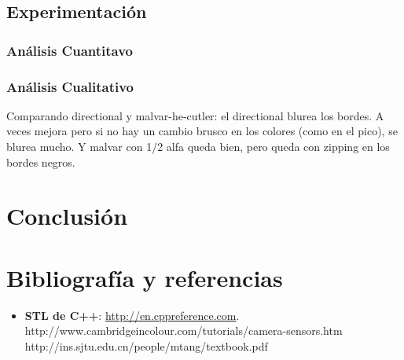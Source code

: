 	
\subsection{Experimentación}


\subsubsection{Análisis Cuantitavo}

\subsubsection{Análisis Cualitativo}

Comparando directional y malvar-he-cutler: el directional blurea los bordes. A veces mejora pero si no hay un cambio brusco en los colores (como en el pico), se blurea mucho. Y malvar con 1/2 alfa queda bien, pero queda con zipping en los bordes negros.


\section{Conclusión}


\section{Bibliografía y referencias} %

\begin{itemize}
	\item \textbf{STL de C++}: \url{http://en.cppreference.com}.
http://www.cambridgeincolour.com/tutorials/camera-sensors.htm
http://ins.sjtu.edu.cn/people/mtang/textbook.pdf
\end{itemize}




